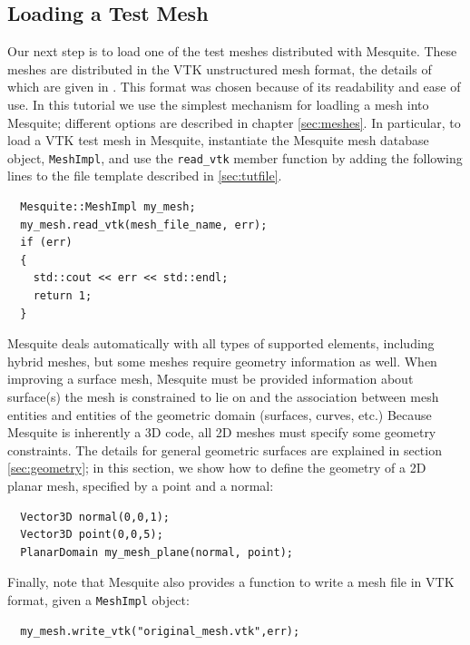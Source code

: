 \subsection{Loading a Test Mesh}
\label{sec:tutMesh}
Our next step is to load one of the test meshes distributed with
Mesquite.  These meshes are distributed in the VTK unstructured mesh
format, the details of which are given in \cite{VTKbook, VTKuml}. This
format was chosen because of its readability and ease of use.
In this tutorial we use
the simplest mechanism for loadling a mesh into Mesquite; different
options are described in chapter \ref{sec:meshes}.  In particular, to
load a VTK test mesh in Mesquite, instantiate the Mesquite mesh
database object,
\texttt{MeshImpl}, and use the \texttt{read\_vtk} member function by
adding the following lines to the file template described in
\ref{sec:tutfile}.
\begin{verbatim}
  Mesquite::MeshImpl my_mesh;
  my_mesh.read_vtk(mesh_file_name, err); 
  if (err) 
  {
    std::cout << err << std::endl;
    return 1;
  }
\end{verbatim}
Mesquite deals automatically with all types of supported elements,
including hybrid meshes, but some meshes require geometry information
as well.  When improving a surface mesh, Mesquite must be provided information
about surface(s) the mesh is constrained to lie on and the association between
mesh entities and entities of the geometric domain (surfaces, curves, etc.)
Because Mesquite is inherently a 3D code, all 2D meshes must specify some
geometry constraints.  The details
for general geometric surfaces are explained in section
\ref{sec:geometry}; in this section,
we show how to define the geometry of a 2D planar mesh, specified by a
point and a normal:
\begin{verbatim}
  Vector3D normal(0,0,1);
  Vector3D point(0,0,5);
  PlanarDomain my_mesh_plane(normal, point);
\end{verbatim}

Finally, note that Mesquite also provides a function to write a mesh
file in VTK format, given a \texttt{MeshImpl} object:
\begin{verbatim}
  my_mesh.write_vtk("original_mesh.vtk",err); 
\end{verbatim}


